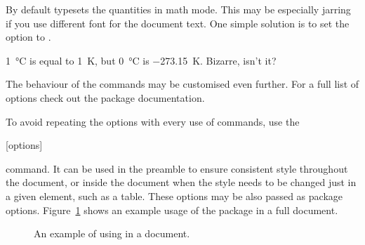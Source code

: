 By default  typesets the quantities in math mode. This may be
especially jarring if you use different font for the document text. One simple
solution is to set the  option to .
\begin{example}[examplewidth=0.4\linewidth]
\setmainfont{SourceSansPro-Regular.otf} %
\qty{1}{\degreeCelsius} is
equal to \qty{1}{\kelvin}, but
\qty[mode = text]{0}{\degreeCelsius}
is \qty[mode = text]{-273.15}{\kelvin}.
Bizarre, isn't it?
\end{example}

The behaviour of the commands may be customised even further. For a full list
of options check out the  package documentation.

To avoid repeating the options with every use of commands, use the
\begin{lscommand}
[options]
\end{lscommand}
command. It can be used in the preamble to ensure consistent style throughout
the document, or inside the document when the style needs to be changed just
in a given element, such as a table. These options may be also passed as package
options. Figure~\ref{sistandaloneexa} shows an example usage of the package in
a full document.
\begin{figure}[htp]
\caption{An example of using  in a document.}
\label{sistandaloneexa}
\end{figure}

